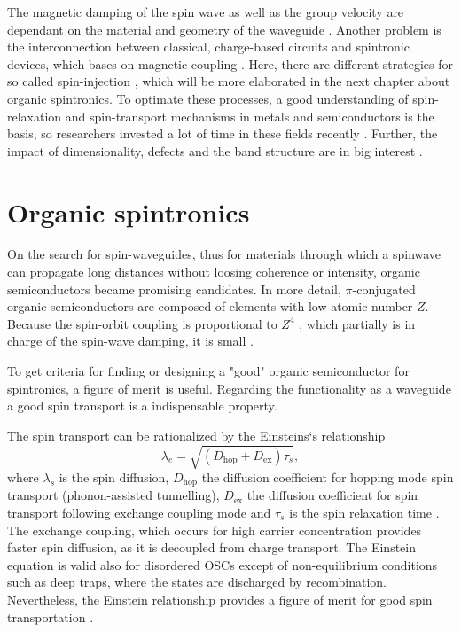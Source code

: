 The magnetic damping of the spin wave as well as the group velocity are dependant on the material and geometry of the waveguide \cite{computing} \cite{SC-spintronics}.
Another problem is the interconnection between classical, charge-based circuits and spintronic devices, which bases on magnetic-coupling \cite{clocks}. 
Here, there are different strategies for so called spin-injection \cite{perovskite}, which will be more elaborated in the next chapter about organic spintronics.
To optimate these processes, a good understanding of spin-relaxation and spin-transport mechanisms in metals and semiconductors is the basis, so researchers invested a lot of time in these fields recently \cite{perovskite}.
Further, the impact of dimensionality, defects and the band structure are in big interest \cite{perovskite} \cite{SC-spintronics}.


\section{Organic spintronics}
\label{sec:org-spintronics}
On the search for spin-waveguides, thus for materials through which a spinwave can propagate long distances without loosing coherence or intensity, organic semiconductors became promising candidates.
In more detail, $\pi$-conjugated organic semiconductors are composed of elements with low atomic number $Z$.
Because the spin-orbit coupling is proportional to $Z^4$ \cite{routes}, which partially is in charge of the spin-wave damping, it is small \cite{appl-organic}.

To get criteria for finding or designing a "good" organic semiconductor for spintronics, a figure of merit is useful.
Regarding the functionality as a waveguide a good spin transport is a indispensable property.

The spin transport can be rationalized by the Einsteins`s relationship 
\begin{equation}
    \lambda_e = \sqrt{(D_\text{hop} + D_\text{ex})\tau_s},
\end{equation}
where $\lambda_s$ is the spin diffusion, $D_\text{hop}$ the diffusion coefficient for hopping mode spin transport (phonon-assisted tunnelling), $D_\text{ex}$ the diffusion coefficient for spin transport following exchange coupling mode and $\tau_s$ is the spin relaxation time \cite{perovskite}.
The exchange coupling, which occurs for high carrier concentration provides faster spin diffusion, as it is decoupled from charge transport.
The Einstein equation is valid also for disordered OSCs except of non-equilibrium conditions such as deep traps, where the states are discharged by recombination.
Nevertheless, the Einstein relationship provides a figure of merit for good spin transportation \cite{single-crystals}.


